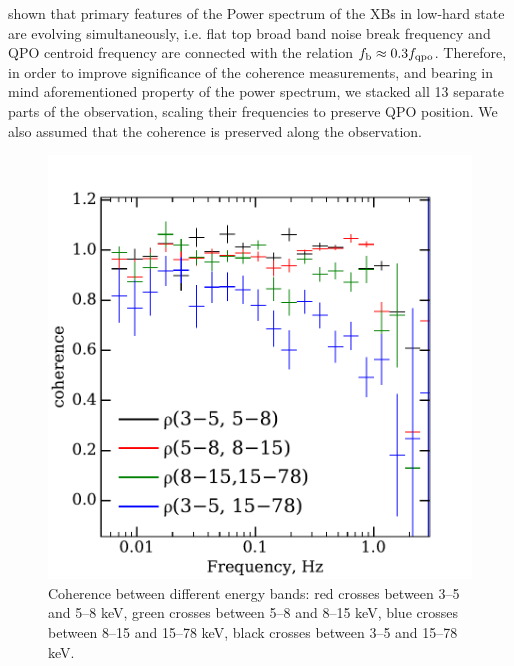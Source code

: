 \documentclass[a4paper,fleqn,usenatbib]{mnras}
\def\grs{{GRS\,1739-278\,}}
\begin{document}
\citet{wijnands99} shown that primary features of the Power spectrum of the XBs in low-hard state are evolving simultaneously, i.e. flat top broad band noise break frequency and QPO centroid frequency are connected with the relation $f_{\rm b} \approx 0.3 f_{\rm qpo}$.
Therefore, in order to improve significance of the coherence measurements, and bearing in mind aforementioned property of the power spectrum, we stacked all 13 separate parts of the observation, scaling their frequencies to preserve QPO position. 
We also assumed that the coherence is preserved along the observation. %


\begin{figure}
    \includegraphics[width=\columnwidth]{coherence_4.pdf}
    \caption{Coherence between different energy bands:  red crosses between 3--5 and 5--8 keV,
     green crosses between 5--8 and 8--15 keV, blue crosses between 8--15 and 15--78 keV, black crosses between 3--5 and 15--78 keV.}
    \label{fig:coherence}
\end{figure}

\end{document}
